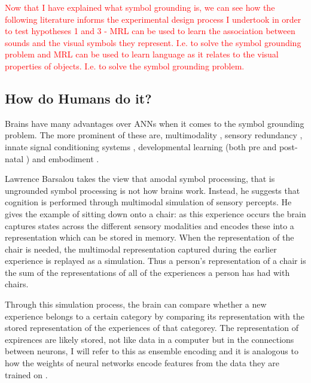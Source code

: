 \textcolor{red}{Now that I have explained what symbol grounding is, we can see how the following literature informs the experimental design process I undertook in order to test hypotheses 1 and 3 - \ac{MRL} can be used to learn the association between sounds and the visual symbols they represent. I.e. to solve the symbol grounding problem and \ac{MRL} can be used to learn language as it relates to the visual properties of objects. I.e. to solve the symbol grounding problem.}


\subsection{How do Humans do it?}
Brains have many advantages over \acp{ANN} when it comes to the symbol grounding problem. The more prominent of these are, multimodality \cite{barsalou2008grounded}, sensory redundancy \cite{slater1999intermodal}, innate signal conditioning systems \cite{masland2012neuronal, fantz1963pattern, johnson2015two}, developmental learning (both pre \cite{webb2015mother, reid2017human} and post-natal \cite{johnson2015two}) and embodiment \cite{pfeifer2006body, smith2005development}.

Lawrence Barsalou \cite{barsalou2008grounded} takes the view that amodal symbol processing, that is ungrounded symbol processing is not how brains work. Instead, he suggests that cognition is performed through multimodal simulation of sensory percepts. He gives the example of sitting down onto a chair: as this experience occurs the brain captures states across the different sensory modalities and encodes these into a representation which can be stored in memory. When the representation of the chair is needed, the multimodal representation captured during the earlier experience is replayed as a simulation. Thus a person's representation of a chair is the sum of the representations of all of the experiences a person has had with chairs. 

Through this simulation process, the brain can compare whether a new experience belongs to a certain category by comparing its representation with the stored representation of the experiences of that categorey. The representation of expirences are likely stored, not like data in a computer but in the connections between neurons, I will refer to this as ensemble encoding \cite{nicolelis1995sensorimotor} and it is analogous to how the weights of neural networks encode features from the data they are trained on \cite{mordvintsev2015inceptionism}.


